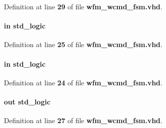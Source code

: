 Definition at line {\bf 29} of file {\bf wfm\+\_\+wcmd\+\_\+fsm.\+vhd}.

\paragraph[{wcmd\+\_\+rdy}]{ {\bfseries \textcolor{keywordflow}{in}\textcolor{vhdlchar}{ }} {\bfseries \textcolor{comment}{std\+\_\+logic}\textcolor{vhdlchar}{ }} \hspace{0.3cm}{\ttfamily [Port]}}\label{classwfm__wcmd__fsm_a70cfe6939e8d71def35eeaeff9b081e5}


Definition at line {\bf 25} of file {\bf wfm\+\_\+wcmd\+\_\+fsm.\+vhd}.

\paragraph[{wcmd\+\_\+reset\+\_\+n}]{ {\bfseries \textcolor{keywordflow}{in}\textcolor{vhdlchar}{ }} {\bfseries \textcolor{comment}{std\+\_\+logic}\textcolor{vhdlchar}{ }} \hspace{0.3cm}{\ttfamily [Port]}}\label{classwfm__wcmd__fsm_aac7e87fea52e3113a81259b78798028c}


Definition at line {\bf 24} of file {\bf wfm\+\_\+wcmd\+\_\+fsm.\+vhd}.

\paragraph[{wcmd\+\_\+wr}]{ {\bfseries \textcolor{keywordflow}{out}\textcolor{vhdlchar}{ }} {\bfseries \textcolor{comment}{std\+\_\+logic}\textcolor{vhdlchar}{ }} \hspace{0.3cm}{\ttfamily [Port]}}\label{classwfm__wcmd__fsm_a765b8764f626115d2a60e0cd8cdaf258}


Definition at line {\bf 27} of file {\bf wfm\+\_\+wcmd\+\_\+fsm.\+vhd}.

